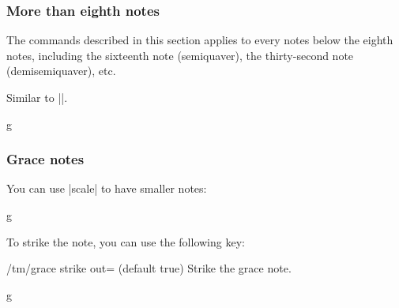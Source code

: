 \subsubsection{More than eighth notes}\label{sec:music-notes:commands:more-than-eighth}
The commands described in this section applies to every notes below the eighth 
notes, including the sixteenth note (semiquaver), the thirty-second note 
(demisemiquaver), etc.
\begin{command}{\tmmorethaneighth{}}
  Similar to |\tmhalf|.
\end{command}
\begin{codeexample}[]
\begin{tmline}%
\begin{tmstaff}{g}{}
\end{tmstaff}%
\end{tmline}
\end{codeexample}
\subsubsection{Grace notes}\label{sec:music-notes:commands:grace}
You can use |scale| to have smaller notes:
\begin{codeexample}[]
\begin{tmline}
\begin{tmstaff}{g}{}
\end{tmstaff}
\end{tmline}
\end{codeexample}
To strike the note, you can use the following key:
\begin{key}{/tm/grace strike out= (default true)}
  Strike the grace note.
\end{key}
\begin{codeexample}[]
\begin{tmline}
\begin{tmstaff}{g}{}
\end{tmstaff}
\end{tmline}
\end{codeexample}
